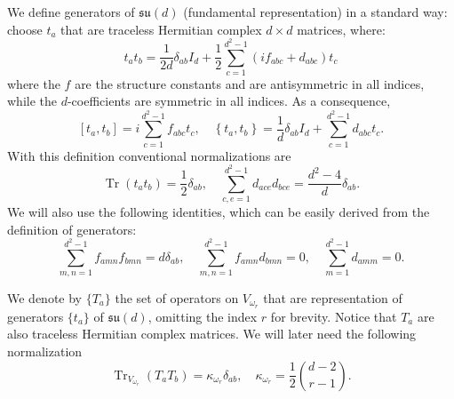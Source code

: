 \documentclass[10pt,twocolumn,superscriptaddress,aps,amsmath,amssymb,citeautoscript,floatfix,prx]{revtex4-2}
\theoremstyle{plain}
\theoremstyle{plain}
\theoremstyle{plain}
\theoremstyle{plain}
\theoremstyle{plain}
\theoremstyle{plain}
\theoremstyle{plain}
\theoremstyle{definition}
\theoremstyle{plain}
\begin{document}
\begin{appendix}
We define generators of $\mathfrak{su}(d)$ (fundamental representation) in a standard way:
choose $t_a$ that are traceless Hermitian complex $d \times d$ matrices, where:
\begin{equation}\label{eq:sudgenerators}
t_a t_b=\frac{1}{2 d} \delta_{a b} I_d+\frac{1}{2} \sum_{c=1}^{d^2-1}\left(i f_{a b c}+d_{a b c}\right) t_c
\end{equation}
where the $f$ are the structure constants and are antisymmetric in all indices, while the $d$-coefficients are symmetric in all indices.
As a consequence,
$$
\left[t_a, t_b\right]=i \sum_{c=1}^{d^2-1} f_{a b c} t_c, \quad \left\{t_a, t_b\right\}=\frac{1}{d} \delta_{a b} I_d+\sum_{c=1}^{d^2-1} d_{a b c} t_c.
$$
With this definition conventional normalizations are
\begin{equation}\label{eq:sudnormalisation}
\operatorname{Tr}\left(t_a t_b\right)=\frac{1}{2} \delta_{a b}, \quad \sum_{c, e=1}^{d^2-1} d_{a c e} d_{b c e}=\frac{d^2-4}{d} \delta_{a b}.
\end{equation}
We will also use the following identities, which can be easily derived from the definition of generators:
\begin{equation}\label{eq:sudidentities}
    \sum_{m, n=1}^{d^2-1}f_{a m n} f_{b m n}=d \delta_{a b}, \quad \sum_{m, n=1}^{d^2-1}f_{a m n} d_{b m n}=0 , \quad \sum_{m=1}^{d^2-1}d_{a m m}=0 .
\end{equation}

We denote by $\{T_a\}$ the set of operators on $V_{\omega_r}$ that are representation of generators $\{t_a\}$ of $\mathfrak{su}(d)$, omitting the index $r$ for brevity.
Notice that $T_a$ are also traceless Hermitian complex matrices.
We will later need the following normalization 
\begin{equation}\label{eq:sudnormalisation_2}
\operatorname{Tr}_{V_{\omega_r}}\left(T_a T_b\right)=\kappa_{\omega_r} \delta_{a b}, \quad \kappa_{\omega_r}=\frac{1}{2}\binom{d-2}{r-1}.
\end{equation}


\end{appendix}
\end{document}
